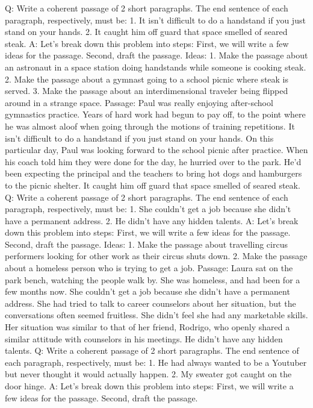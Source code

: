 \documentclass[11pt]{article}
\begin{document}
Q: Write a coherent passage of 2 short paragraphs. The end sentence of each paragraph, respectively, must be: 1. It isn't difficult to do a handstand if you just stand on your hands. 2. It caught him off guard that space smelled of seared steak.
A: Let's break down this problem into steps: First, we will write a few ideas for the passage. Second, draft the passage.
Ideas:
1. Make the passage about an astronaut in a space station doing handstands while someone is cooking steak.
2. Make the passage about a gymnast going to a school picnic where steak is served.
3. Make the passage about an interdimensional traveler being flipped around in a strange space.
Passage:
Paul was really enjoying after-school gymnastics practice. Years of hard work had begun to pay off, to the point where he was almost aloof when going through the motions of training repetitions. It isn't difficult to do a handstand if you just stand on your hands.
On this particular day, Paul was looking forward to the school picnic after practice. When his coach told him they were done for the day, he hurried over to the park. He'd been expecting the principal and the teachers to bring hot dogs and hamburgers to the picnic shelter. It caught him off guard that space smelled of seared steak.
Q: Write a coherent passage of 2 short paragraphs. The end sentence of each paragraph, respectively, must be: 1. She couldn't get a job because she didn't have a permanent address. 2. He didn't have any hidden talents.
A: Let's break down this problem into steps: First, we will write a few ideas for the passage. Second, draft the passage.
Ideas:
1. Make the passage about travelling circus performers looking for other work as their circus shuts down.
2. Make the passage about a homeless person who is trying to get a job. 
Passage: 
Laura sat on the park bench, watching the people walk by. She was homeless, and had been for a few months now. She couldn't get a job because she didn't have a permanent address.
She had tried to talk to career counselors about her situation, but the conversations often seemed fruitless. She didn't feel she had any marketable skills. Her situation was similar to that of her friend, Rodrigo, who openly shared a similar attitude with counselors in his meetings. He didn't have any hidden talents.
Q: Write a coherent passage of 2 short paragraphs. The end sentence of each paragraph, respectively, must be: 1. He had always wanted to be a Youtuber but never thought it would actually happen. 2. My sweater got caught on the door hinge.
A: Let's break down this problem into steps: First, we will write a few ideas for the passage. Second, draft the passage.
\end{document}
